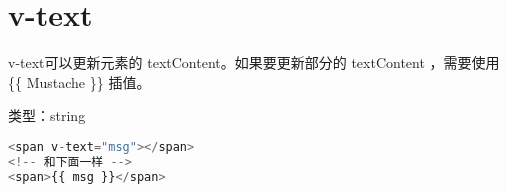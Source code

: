 \chapter{v-text}


v-text可以更新元素的 textContent。如果要更新部分的 textContent ，需要使用 \{\{ Mustache \}\} 插值。

\begin{compactitem}
\item 类型：string
\end{compactitem}


\begin{lstlisting}[language=JavaScript]
<span v-text="msg"></span>
<!-- 和下面一样 -->
<span>{{ msg }}</span>
\end{lstlisting}



\begin{lstlisting}[language=JavaScript]

\end{lstlisting}




\begin{lstlisting}[language=JavaScript]

\end{lstlisting}




\begin{lstlisting}[language=JavaScript]

\end{lstlisting}




\begin{lstlisting}[language=JavaScript]

\end{lstlisting}




\begin{lstlisting}[language=JavaScript]

\end{lstlisting}




\begin{lstlisting}[language=JavaScript]

\end{lstlisting}




\begin{lstlisting}[language=JavaScript]

\end{lstlisting}

